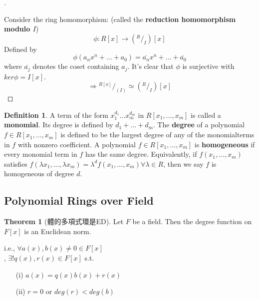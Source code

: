 \documentclass[12pt]{article}
\theoremstyle{definition}
\newtheorem{thm}{Theorem}
\newtheorem{dfn}{Definition}
\newenvironment{proofs}[1][\proofname]{%
  \begin{proof}[#1]$ $\par\nobreak\ignorespaces
}{%
  \end{proof}
}
\newcommand*\quot[2]{{^{\textstyle #1}\big/_{\textstyle #2}}}
\begin{document}
\begin{proofs}
	Consider the ring homomorphism: (called the \textbf{reduction homomorphism modulo $I$})
	$$\phi: R[x] \rightarrow (\quot{R}{I}) [x]$$
	Defined by
	$$\phi(a_n x^n + \hdots + a_0) = \overline{a_n} x^n + \hdots + \overline{a_0}$$
	where $\overline{a_j}$ denotes the coset containing $a_j$. It's clear that $\phi$ is surjective with $ker \phi = I[x]$.
	$$\Rightarrow \quot{R[x]}{(I)} \simeq (\quot{R}{I})[x]$$
\end{proofs}

\begin{dfn}
	A term of the form $x_1^{d_1} \hdots x_m^{d_m}$ in $R[x_1, \hdots , x_m]$ is called a \textbf{monomial}. Its degree is defined by $d_1 + \hdots + d_m$. The \textbf{degree} of a polynomial $f \in R[x_1, \hdots , x_m]$ is defined to be the largest degree of any of the monomialterms in $f$ with nonzero coefficient. A polynomial $f \in R[x_1, \hdots , x_m]$ is \textbf{homogeneous} if every monomial term in $f$ has the same degree. Equivalently, if $f(x_1, \hdots , x_m)$ satisfies $f(\lambda x_1, \hdots , \lambda x_m) = \lambda^d f(x_1, \hdots , x_m) \forall \lambda \in R$, then we say $f$ is homogeneous of degree $d$.
\end{dfn}

\subsection{Polynomial Rings over Field}

\begin{thm}[體的多項式環是ED]
	Let $F$ be a field. Then the degree function on $F[x]$ is an Euclidean norm.

	i.e.,  $\forall a(x), b(x) \neq 0 \in F[x]$ \\, $\exists ! q(x), r(x) \in F[x]$ s.t.
	\begin{itemize}
		\item[(i)] $a(x) = q(x) b(x) + r(x)$
		\item[(ii)] $r = 0$ or $deg(r) < deg(b)$
	\end{itemize}
\end{thm}
\end{document}
